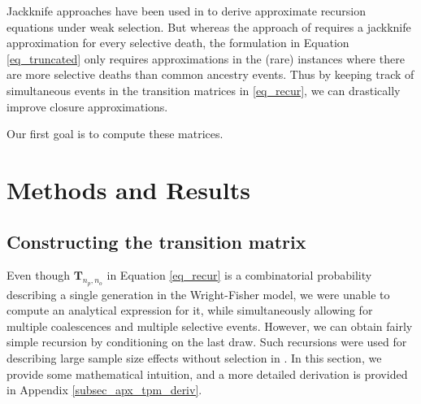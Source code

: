 \documentclass[review,nonatbib]{elsarticle}
\begin{document}
Jackknife approaches have been used in \cite{JouganousEtAl2017} to derive approximate 
recursion equations under weak selection. But whereas the approach of \cite{JouganousEtAl2017} 
requires a jackknife approximation for every selective death, the formulation in Equation \eqref{eq_truncated}
only requires approximations in the (rare) instances where there are more selective deaths than 
common ancestry events. Thus by keeping track of simultaneous events in the transition matrices
in \eqref{eq_recur}, we can drastically improve closure  approximations. 

Our first goal is to compute these matrices.

\section{Methods and Results}
\label{sec_methods}

\subsection{Constructing the transition matrix}
\label{subsec_trans_mat}

Even though $\mathbf{T}_{n_p,n_o}$ in Equation \ref{eq_recur} is a combinatorial probability
describing a single generation in the Wright-Fisher model, we were unable to compute an analytical
expression for it, while simultaneously allowing for multiple coalescences and multiple selective events.
However,
we can obtain fairly simple recursion by conditioning on the last draw. Such recursions were used for
describing large sample size effects without selection in \citep{BhaskarEtAl2014}. In this section,
we provide some mathematical intuition, and a more detailed derivation is provided in
Appendix \ref{subsec_apx_tpm_deriv}.
\end{document}
